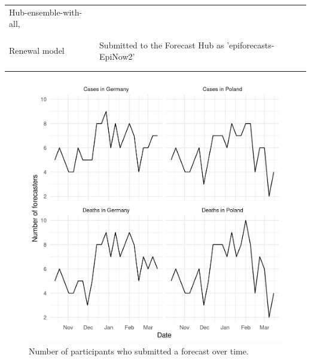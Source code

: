 \documentclass[
]{article}
\begin{document}
\begin{longtable}[t]{>{\raggedright\arraybackslash}p{4.5cm}>{\raggedright\arraybackslash}p{11.0cm}}
\addlinespace \addlinespace
Hub-ensemble-with-all, 
\cellcolor{gray!6}{    Hub-ensemble-with-all-mean} & \cellcolor{gray!6}{Versions of the official Hub ensembles which includes all our contributions. For cases, this is identical to the official Hub ensembles, but for deaths the convolution model was added.}\\
\addlinespace \addlinespace
 & \\
\addlinespace \addlinespace
\cellcolor{gray!6}{Crowd forecast} & \cellcolor{gray!6}{Submitted to the Forecast Hub as 'epiforecasts-EpiExpert'}\\
\addlinespace \addlinespace
Renewal model & Submitted to the Forecast Hub as 'epiforecasts-EpiNow2'\\
\addlinespace \addlinespace
\cellcolor{gray!6}{Convolution model} & \cellcolor{gray!6}{Submitted to the Forecast Hub as 'epiforecasts-EpiNow2\_secondary'}\\*
\end{longtable}

\begin{figure}[H]
\includegraphics[width=1\linewidth,]{../analysis/plots/number-forecasters} \caption{Number of participants who submitted a forecast over time.}\label{fig:num-forecasters}
\end{figure}
\end{document}
